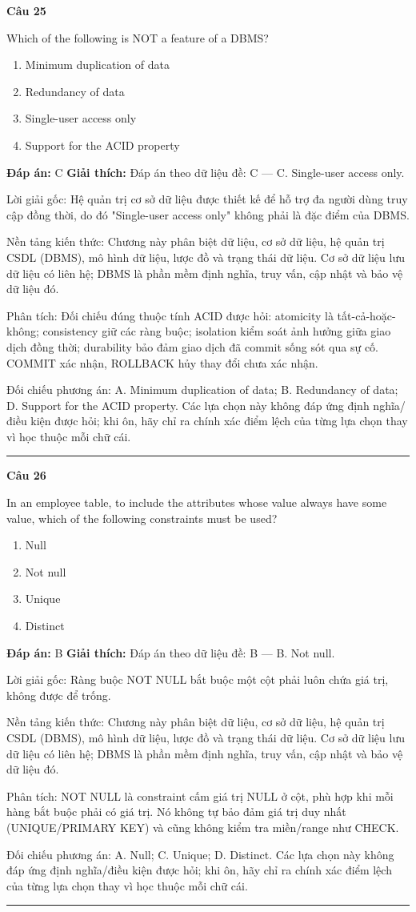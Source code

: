 \documentclass[11pt,a4paper]{article}
\newenvironment{question}[1]{%
  \par\vspace{1em}\noindent\textbf{\large Câu #1}\par\vspace{0.4em}
}{%
  \par\vspace{1em}\hrule\vspace{0.6em}
}
\newenvironment{choices}{%
  \begin{enumerate}[label=\textbf{\Alph*.},leftmargin=2.2em,itemsep=2pt,topsep=3pt]
}{%
  \end{enumerate}
}
\newcommand{\choice}{\item}
\begin{document}
\begin{question}{25}
Which of the following is NOT a feature of a DBMS?
\begin{choices}
\choice Minimum duplication of data
\choice Redundancy of data
\choice Single-user access only
\choice Support for the ACID property
\end{choices}
\textbf{Đáp án:} C
\textbf{Giải thích:} Đáp án theo dữ liệu đề: C — C. Single-user access only.

Lời giải gốc: Hệ quản trị cơ sở dữ liệu được thiết kế để hỗ trợ đa người dùng truy cập đồng thời, do đó "Single-user access only" không phải là đặc điểm của DBMS.

Nền tảng kiến thức: Chương này phân biệt dữ liệu, cơ sở dữ liệu, hệ quản trị CSDL (DBMS), mô hình dữ liệu, lược đồ và trạng thái dữ liệu. Cơ sở dữ liệu lưu dữ liệu có liên hệ; DBMS là phần mềm định nghĩa, truy vấn, cập nhật và bảo vệ dữ liệu đó.

Phân tích: Đối chiếu đúng thuộc tính ACID được hỏi: atomicity là tất-cả-hoặc-không; consistency giữ các ràng buộc; isolation kiểm soát ảnh hưởng giữa giao dịch đồng thời; durability bảo đảm giao dịch đã commit sống sót qua sự cố. COMMIT xác nhận, ROLLBACK hủy thay đổi chưa xác nhận.

Đối chiếu phương án: A. Minimum duplication of data; B. Redundancy of data; D. Support for the ACID property. Các lựa chọn này không đáp ứng định nghĩa/điều kiện được hỏi; khi ôn, hãy chỉ ra chính xác điểm lệch của từng lựa chọn thay vì học thuộc mỗi chữ cái.
\end{question}

\begin{question}{26}
In an employee table, to include the attributes whose value always have some value, which of the following constraints must be used?
\begin{choices}
\choice Null
\choice Not null
\choice Unique
\choice Distinct
\end{choices}
\textbf{Đáp án:} B
\textbf{Giải thích:} Đáp án theo dữ liệu đề: B — B. Not null.

Lời giải gốc: Ràng buộc NOT NULL bắt buộc một cột phải luôn chứa giá trị, không được để trống.

Nền tảng kiến thức: Chương này phân biệt dữ liệu, cơ sở dữ liệu, hệ quản trị CSDL (DBMS), mô hình dữ liệu, lược đồ và trạng thái dữ liệu. Cơ sở dữ liệu lưu dữ liệu có liên hệ; DBMS là phần mềm định nghĩa, truy vấn, cập nhật và bảo vệ dữ liệu đó.

Phân tích: NOT NULL là constraint cấm giá trị NULL ở cột, phù hợp khi mỗi hàng bắt buộc phải có giá trị. Nó không tự bảo đảm giá trị duy nhất (UNIQUE/PRIMARY KEY) và cũng không kiểm tra miền/range như CHECK.

Đối chiếu phương án: A. Null; C. Unique; D. Distinct. Các lựa chọn này không đáp ứng định nghĩa/điều kiện được hỏi; khi ôn, hãy chỉ ra chính xác điểm lệch của từng lựa chọn thay vì học thuộc mỗi chữ cái.
\end{question}
\end{document}
